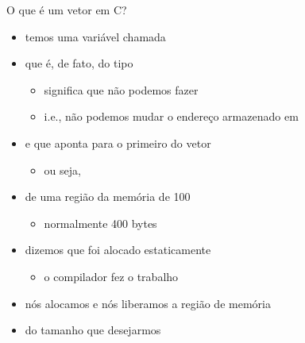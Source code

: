 \documentclass{beamer}
\begin{document}
\begin{frame}[<+->]{O que é um vetor em C?}
  \begin{itemize}
    \item temos uma variável chamada 
    \item que é, de fato, do tipo 
      \begin{itemize}
        \item {} significa que não podemos fazer 
        \item i.e., não podemos mudar o endereço armazenado em 
      \end{itemize}
    \item e que aponta para o primeiro  do vetor
      \begin{itemize}
        \item ou seja, 
      \end{itemize}
    \item de uma região da memória de 100 
      \begin{itemize}
        \item normalmente 400 bytes
      \end{itemize}
    \item dizemos que  foi alocado estaticamente
      \begin{itemize}
        \item o compilador fez o trabalho
      \end{itemize}
  \end{itemize}

  \bigskip
  \begin{itemize}
    \item nós alocamos e nós liberamos a região de memória
    \item do tamanho que desejarmos
  \end{itemize}
\end{frame}
\end{document}
